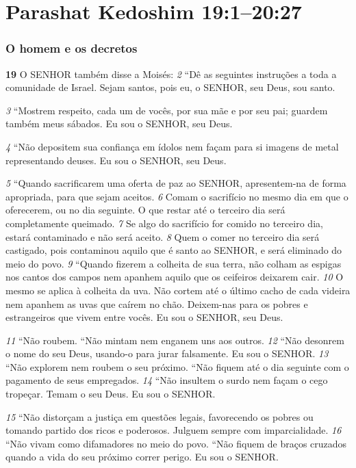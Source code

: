 \section*{Parashat Kedoshim 19:1–20:27}

\subsubsection*{O homem e os decretos}
\textbf{\large 19}
 O SENHOR também disse a Moisés: 
\textit{\tiny 2} 
“Dê as seguintes instruções a toda a
comunidade de Israel. Sejam santos, pois eu, o SENHOR, seu Deus, sou santo. 

\smallskip
\textit{\tiny 3} 
“Mostrem respeito, cada um de vocês, por sua mãe e por seu pai; guardem
também meus sábados. Eu sou o SENHOR, seu Deus. 

\smallskip
\textit{\tiny 4} 
“Não depositem sua confiança em ídolos nem façam para si imagens de metal
representando deuses. Eu sou o SENHOR, seu Deus. 

\smallskip
\textit{\tiny 5} 
“Quando sacrificarem uma oferta de paz ao SENHOR, apresentem-na de forma
apropriada, para que sejam aceitos. 
\textit{\tiny 6} 
Comam o sacrifício no mesmo dia em que o
oferecerem, ou no dia seguinte. O que restar até o terceiro dia será
completamente queimado. 
\textit{\tiny 7} 
Se algo do sacrifício for comido no terceiro dia,
estará contaminado e não será aceito. 
\textit{\tiny 8} 
Quem o comer no terceiro dia será
castigado, pois contaminou aquilo que é santo ao SENHOR, e será eliminado do
meio do povo. 
\textit{\tiny 9} 
“Quando fizerem a colheita de sua terra, não colham as espigas nos cantos dos
campos nem apanhem aquilo que os ceifeiros deixarem cair. 
\textit{\tiny 10}
O mesmo se
aplica à colheita da uva. Não cortem até o último cacho de cada videira nem
apanhem as uvas que caírem no chão. Deixem-nas para os pobres e estrangeiros
que vivem entre vocês. Eu sou o SENHOR, seu Deus.
   
\smallskip
\textit{\tiny 11}
“Não roubem.
   “Não mintam nem enganem uns aos outros.
\textit{\tiny 12}
“Não desonrem o nome do seu Deus, usando-o para jurar falsamente. Eu sou
o SENHOR.
\textit{\tiny 13}
“Não explorem nem roubem o seu próximo.
   “Não fiquem até o dia seguinte com o pagamento de seus empregados.
\textit{\tiny 14}
“Não insultem o surdo nem façam o cego tropeçar. Temam o seu Deus. Eu
sou o SENHOR.
   
\smallskip
\textit{\tiny 15}
“Não distorçam a justiça em questões legais, favorecendo os pobres ou
tomando partido dos ricos e poderosos. Julguem sempre com imparcialidade.
\textit{\tiny 16}
“Não vivam como difamadores no meio do povo.
“Não fiquem de braços cruzados quando a vida do seu próximo correr perigo.
Eu sou o SENHOR.
   
